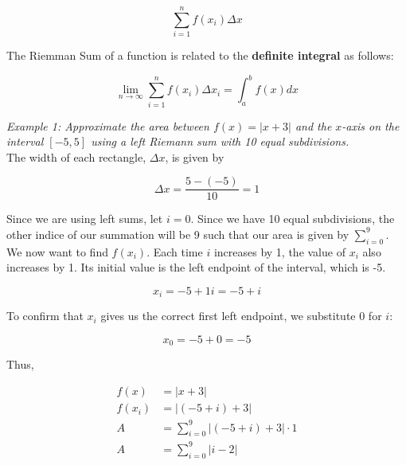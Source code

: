\documentclass{article}
\begin{document}
            \begin{equation*}
                \sum_{i=1}^n f(x_i)\Delta x
            \end{equation*}

            \noindent The Riemman Sum of a function is related to the \textbf{definite integral} as
            follows:

            \begin{equation*}
                \lim_{n\rightarrow\infty}\sum^n_{i=1}f(x_i)\Delta x_i = \int^b_a f(x)dx
            \end{equation*}

            \noindent \color{blue} \textit{Example 1: Approximate the area between $f(x)=|x+3|$ and
            the $x$-axis on the interval $[-5,5]$ using a left Riemann sum with 10 equal subdivisions.}
            \color{black} \\

            \noindent The width of each rectangle, $\Delta x$, is given by

            \begin{equation*}
                \Delta x = \frac{5-(-5)}{10} = 1
            \end{equation*}

            \noindent Since we are using left sums, let $i=0$. Since we have 10 equal subdivisions, the other
            indice of our summation will be 9 such that our area is given by $\sum^9_{i=0}$. We now
            want to find $f(x_i)$. Each time $i$ increases by 1, the value of $x_i$ also increases
            by 1. Its initial value is the left endpoint of the interval, which is -5.

            \begin{equation*}
                x_i = -5 + 1i = -5 + i
            \end{equation*}

            \noindent To confirm that $x_i$ gives us the correct first left endpoint, we substitute 0 for $i$:

            \begin{equation*}
                x_0=-5+0=-5
            \end{equation*}

            \noindent Thus,

            \begin{align*}
                f(x)    &= |x+3| \\
                f(x_i)  &= |(-5+i) +3| \\
                A       &= \sum_{i=0}^9 |(-5+i) + 3| \cdot 1 \\
                A       &= \sum_{i=0}^9 |i-2|
            \end{align*}
\end{document}
